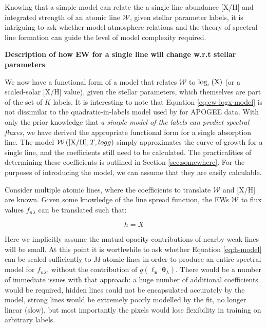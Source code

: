 \documentclass[useAMS,usenatbib]{mn2e}
\newcommand\lv{\mathbf{\boldsymbol\ell_n}}
\newcommand\cv{{\boldsymbol\theta}_\lambda}
\newcommand\given{|}
\begin{document}

Knowing that a simple model can relate the a single line abundance [X/H] and integrated strength of an atomic line $\mathcal{W}$, given stellar parameter labels, it is intriguing to ask whether model atmosphere relations and the theory of spectral line formation can guide the level of model complexity required.

\textbf{Description of how EW for a single line will change w.r.t stellar parameters}

We now have a functional form of a model that relates $\mathcal{W}$ to $\log_\epsilon\left({\textrm X}\right)$ (or a scaled-solar [X/H] value), given the stellar parameters, which themselves are part of the set of $K$ labels. It is interesting to note that Equation \ref{eq:ew-logx-model} is not dissimilar to the quadratic-in-labels model used by \citet{Ness15a} for APOGEE data. With only the prior knowledge that \textit{a simple model of the labels can predict spectral fluxes}, we have derived the appropriate functional form for a single absorption line. The model $\mathcal{W}\left({\rm [X/H]}, T, logg\right)$ simply approximates the curve-of-growth for a single line, and the coefficients still need to be calculated. The practicalities of determining these coefficients is outlined in Section \ref{sec:somewhere}. For the purposes of introducing the model, we can assume that they are easily calculable.

Consider multiple atomic lines, where the coefficients to translate $\mathcal{W}$ and [X/H] are known. Given some knowledge of the line spread function, the EWs $\mathcal{W}$ to flux values $f_{n\lambda}$ can be translated such that:

\begin{equation}
h = X
\label{eq:h-model}
\end{equation}

Here we implicitly assume the mutual opacity contributions of nearby weak lines will be small. 
At this point it is worthwhile to ask whether Equation \ref{eq:h-model} can be scaled sufficiently to $M$ atomic lines in order to produce an entire spectral model for $f_{n\lambda}$, without the contribution of $g\left(\lv\given\cv\right)$. There would be a number of immediate issues with that approach: a huge number of additional coefficients would be required, hidden lines could not be encapsulated accurately by the model, strong lines would be extremely poorly modelled by the fit, no longer linear (slow), but most importantly the pixels would lose flexibility in training on arbitrary labels. 
\end{document}
